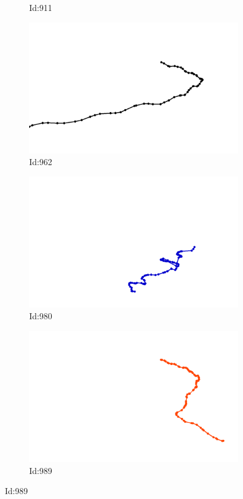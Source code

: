 \documentclass[12pt,twoside]{report}
\begin{document}
\begin{figure}
\begin{subfigure}[b]{0.20\textwidth}
\caption{Id:911}
\end{subfigure}
\begin{subfigure}[b]{0.20\textwidth}
\centering
\includegraphics[width=\textwidth]{../trajectories/962.png}
\caption{Id:962}
\end{subfigure}
\begin{subfigure}[b]{0.20\textwidth}
\centering
\includegraphics[width=\textwidth]{../trajectories/980.png}
\caption{Id:980}
\end{subfigure}
\begin{subfigure}[b]{0.20\textwidth}
\centering
\includegraphics[width=\textwidth]{../trajectories/989.png}
\caption{Id:989}
\end{subfigure}
\end{figure}
\end{document}
